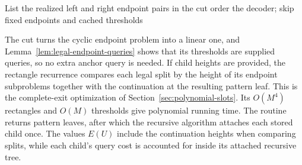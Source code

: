 \begin{algorithm}[H]
\caption{\EndpointCode: legal full-pattern recovery}
\label{alg:endpoint-code}
List the realized left and right endpoint pairs in the cut order\;
\KwRet the decoder; skip fixed endpoints and cached thresholds\;
\end{algorithm}

The cut turns the cyclic endpoint problem into a linear one, and
Lemma~\ref{lem:legal-endpoint-queries} shows that its thresholds are
supplied queries, so no extra anchor query is needed. If child heights
are provided, the rectangle recurrence compares each legal split by
the height of its endpoint subproblems together with the continuation
at the resulting pattern leaf. This is the complete-exit optimization
of Section~\ref{sec:polynomial-slots}. Its $O(M^4)$ rectangles and
$O(M)$ thresholds give polynomial running time. The routine returns
pattern leaves, after which the recursive algorithm attaches each
stored child once. The values $E(U)$ include the continuation heights
when comparing splits, while each child's query cost is accounted for
inside its attached recursive tree.
